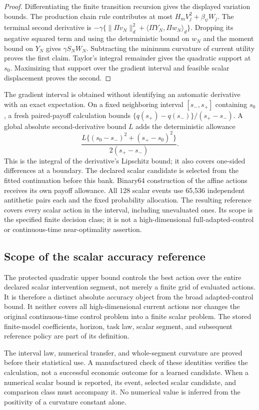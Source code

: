 \begin{proof}
Differentiating the finite transition recursion gives the displayed
variation bounds. The production chain rule contributes at most
$H_mV_j^2+\beta_\psi W_j$. The terminal second derivative is
$-\gamma\{\|\Pi v_N\|_d^2+\langle\Pi Y_N,\Pi w_N\rangle_d\}$.
Dropping its negative squared term and using the deterministic bound
on $w_N$ and the moment bound on $Y_N$ gives $\gamma S_NW_N$.
Subtracting the minimum curvature of current utility proves the
first claim. Taylor's integral remainder gives the quadratic support
at $s_0$. Maximizing that support over the gradient interval and
feasible scalar displacement proves the second.
\end{proof}

The gradient interval is obtained without identifying an automatic
derivative with an exact expectation. On a fixed neighboring interval
$[s_-,s_+]$ containing $s_0$, a fresh paired-payoff calculation bounds
$\{q(s_+)-q(s_-)\}/(s_+-s_-)$. A global absolute second-derivative
bound $L$ adds the deterministic allowance
\[
 \frac{L\{(s_0-s_-)^2+(s_+-s_0)^2\}}{2(s_+-s_-)}.
\]
This is the integral of the derivative's Lipschitz bound; it also
covers one-sided differences at a boundary. The declared scalar
candidate is selected from the fitted continuation before this bank.
Binary64 construction of the affine actions receives its own payoff
allowance. All 128 scalar events use 65,536 independent antithetic
pairs each and the fixed probability allocation. The resulting
reference covers every scalar action in the interval, including
unevaluated ones. Its scope is the specified finite decision class;
it is not a high-dimensional full-adapted-control or continuous-time
near-optimality assertion.

\subsection{Scope of the scalar accuracy reference}
The protected quadratic upper bound controls the best action over the entire declared scalar intervention segment, not merely a finite grid of evaluated actions. It is therefore a distinct absolute accuracy object from the broad adapted-control bound. It neither covers all high-dimensional current actions nor changes the original continuous-time control problem into a finite scalar problem. The stored finite-model coefficients, horizon, task law, scalar segment, and subsequent reference policy are part of its definition.

The interval law, numerical transfer, and whole-segment curvature are proved before their statistical use. A manufactured check of these identities verifies the calculation, not a successful economic outcome for a learned candidate. When a numerical scalar bound is reported, its event, selected scalar candidate, and comparison class must accompany it. No numerical value is inferred from the positivity of a curvature constant alone.


